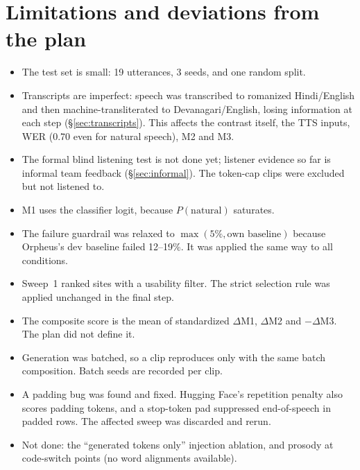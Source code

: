 \documentclass[11pt]{article}
\begin{document}
\section{Limitations and deviations from the plan}
\begin{itemize}
\item The test set is small: 19 utterances, 3 seeds, and one random split.
\item Transcripts are imperfect: speech was transcribed to romanized Hindi/English and then machine-transliterated to Devanagari/English, losing information at each step (\S\ref{sec:transcripts}). This affects the contrast itself, the TTS inputs, WER (0.70 even for natural speech), M2 and M3.
\item The formal blind listening test is not done yet; listener evidence so far is informal team feedback (\S\ref{sec:informal}). The token-cap clips were excluded but not listened to.
\item M1 uses the classifier logit, because $P(\text{natural})$ saturates.
\item The failure guardrail was relaxed to $\max(5\%,\text{own baseline})$ because Orpheus's dev baseline failed 12--19\%. It was applied the same way to all conditions.
\item Sweep~1 ranked sites with a usability filter. The strict selection rule was applied unchanged in the final step.
\item The composite score is the mean of standardized $\Delta$M1, $\Delta$M2 and $-\Delta$M3. The plan did not define it.
\item Generation was batched, so a clip reproduces only with the same batch composition. Batch seeds are recorded per clip.
\item A padding bug was found and fixed. Hugging Face's repetition penalty also scores padding tokens, and a stop-token pad suppressed end-of-speech in padded rows. The affected sweep was discarded and rerun.
\item Not done: the ``generated tokens only'' injection ablation, and prosody at code-switch points (no word alignments available).
\end{itemize}
\end{document}
